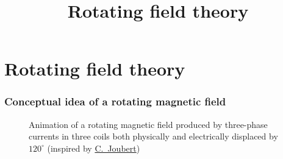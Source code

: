 \section{Rotating field theory}
\title[Rotating field theory]{Rotating field theory}  

\begin{frame}[plain]
    \titlepage
\end{frame}

\begin{frame}
	\frametitle{Conceptual idea of a rotating magnetic field}
    \begin{figure}
        \centering
        \caption{Animation of a rotating magnetic field produced by three-phase currents in three coils both physically and electrically displaced by $120^\circ$ (inspired by \href{https://perso.univ-lyon1.fr/charles.joubert/web_anim/simen_rotfield_create.html}{C.~Joubert})}
        \label{fig:Three_phase_coils_rotating_field_animation}
    \end{figure}
\end{frame}

